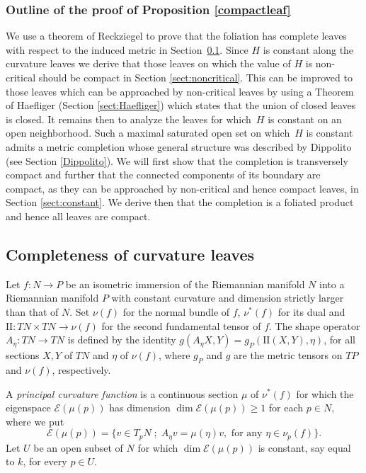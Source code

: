 \documentclass[JEP,XML,SOM,Unicode]{cedram}
\let\mathcal\mathscr
\newcommand{\II}{\mathrm{II}}
\newcommand{\sep}{\;;\;}
\theoremstyle{definition}
\theoremstyle{remark}
\numberwithin{equation}{section}
\begin{document}
\subsubsection*{Outline of the proof of Proposition \ref{compactleaf}}
We use a theorem of Reckziegel to prove that the foliation has complete leaves
with respect to the induced metric in Section~\ref{sect:Reckziegel}. Since $H$ is constant along the curvature leaves we derive that those
leaves on which the value of $H$ is non-critical should be compact in Section \ref{sect:noncritical}. This can be improved
to those leaves which can be approached by non-critical leaves by using a Theorem of Haefliger (Section \ref{sect:Haefliger}) which states that
the union of closed leaves is closed. It remains then to analyze the leaves for which~$H$ is constant on an open neighborhood.
Such a maximal saturated open set on which~$H$ is constant admits a metric completion whose general structure was
described by Dippolito (see Section \ref{Dippolito}). We will first show that the completion is transversely compact and further that
the connected components of its boundary are compact, as they can be approached by non-critical and hence compact leaves, in Section \ref{sect:constant}. We derive then that the completion is a foliated product and hence all leaves are compact.

\subsection{Completeness of curvature leaves}\label{sect:Reckziegel}
Let $f:N\to P$ be an isometric immersion of the Riemannian manifold $N$ into a Riemannian manifold $P$ with constant curvature and dimension strictly larger than that of $N$.
Set $\nu(f)$ for the normal bundle of $f$, $\nu^*(f)$ for its dual and $\II:TN\times TN \to \nu(f)$ for the second fundamental tensor of $f$.
The shape operator $A_{\eta}:TN\to TN$ is defined by the identity
$g(A_{\eta}X,Y)=g_P(\II(X,Y),\eta)$, for all sections $X,Y$ of $TN$ and $\eta$ of $\nu(f)$, where $g_P$ and $g$ are the metric tensors on $TP$ and $\nu(f)$, respectively.

A \emph{principal curvature function} is a continuous section $\mu$ of $\nu^*(f)$ for which the eigenspace $\mathcal E(\mu(p))$ has dimension
$\dim \mathcal E(\mu(p))\geq 1$ for each $p\in N$, where we put
\[ \mathcal E(\mu(p))= \{ v \in T_pN\sep A_{\eta} v= \mu(\eta) v,\text{ for any } \eta\in \nu_p(f)\}.\]
Let $U$ be an open subset of $N$ for which $\dim \mathcal E(\mu(p))$ is constant, say equal to $k$, for every $p\in U$.
\end{document}
